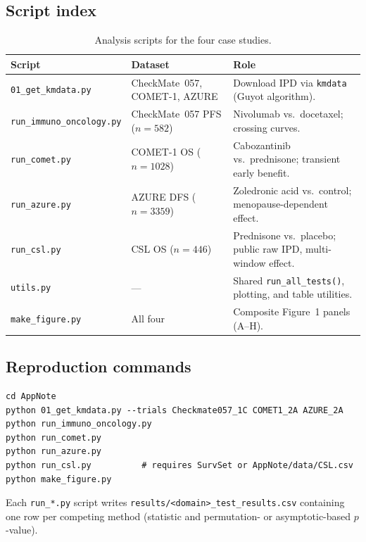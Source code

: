 \documentclass[11pt]{article}
\begin{document}
\subsection*{Script index}

\begin{table}[h]
  \centering
  \caption{Analysis scripts for the four case studies.}
  \label{tab:scripts}
  \small
  \begin{tabular}{@{}llp{6.8cm}@{}}
    \toprule
    Script & Dataset & Role \\
    \midrule
    \texttt{01\_get\_kmdata.py} & CheckMate~057, COMET-1, AZURE &
      Download IPD via \texttt{kmdata} (Guyot algorithm). \\
    \texttt{run\_immuno\_oncology.py} & CheckMate~057 PFS ($n=582$) &
      Nivolumab vs.\ docetaxel; crossing curves. \\
    \texttt{run\_comet.py} & COMET-1 OS ($n=1028$) &
      Cabozantinib vs.\ prednisone; transient early benefit. \\
    \texttt{run\_azure.py} & AZURE DFS ($n=3359$) &
      Zoledronic acid vs.\ control; menopause-dependent effect. \\
    \texttt{run\_csl.py} & CSL OS ($n=446$) &
      Prednisone vs.\ placebo; public raw IPD, multi-window effect. \\
    \texttt{utils.py} & --- &
      Shared \texttt{run\_all\_tests()}, plotting, and table utilities. \\
    \texttt{make\_figure.py} & All four &
      Composite Figure~1 panels (A--H). \\
    \bottomrule
  \end{tabular}
\end{table}

\subsection*{Reproduction commands}

\begin{lstlisting}
cd AppNote
python 01_get_kmdata.py --trials Checkmate057_1C COMET1_2A AZURE_2A
python run_immuno_oncology.py
python run_comet.py
python run_azure.py
python run_csl.py          # requires SurvSet or AppNote/data/CSL.csv
python make_figure.py
\end{lstlisting}

Each \texttt{run\_*.py} script writes
\texttt{results/<domain>\_test\_results.csv} containing one row per
competing method (statistic and permutation- or asymptotic-based
$p$-value).
\end{document}
